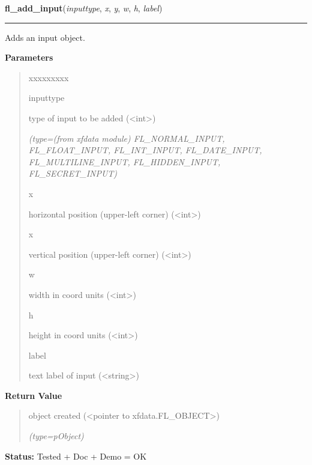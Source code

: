\hspace{.8\funcindent}\begin{boxedminipage}{\funcwidth}

    \raggedright \textbf{fl\_add\_input}(\textit{inputtype}, \textit{x}, \textit{y}, \textit{w}, \textit{h}, \textit{label})

    \vspace{-1.5ex}

    \rule{\textwidth}{0.5\fboxrule}
\setlength{\parskip}{2ex}
    Adds an input object.

\setlength{\parskip}{1ex}
      \textbf{Parameters}
      \vspace{-1ex}

      \begin{quote}
        \begin{Ventry}{xxxxxxxxx}

          \item[inputtype]

          type of input to be added ({\textless}int{\textgreater})

            {\it (type=(from xfdata module) FL\_NORMAL\_INPUT, FL\_FLOAT\_INPUT, FL\_INT\_INPUT, 
FL\_DATE\_INPUT, FL\_MULTILINE\_INPUT, FL\_HIDDEN\_INPUT, FL\_SECRET\_INPUT)}

          \item[x]

          horizontal position (upper-left corner) 
          ({\textless}int{\textgreater})

          \item[x]

          vertical position (upper-left corner) 
          ({\textless}int{\textgreater})

          \item[w]

          width in coord units ({\textless}int{\textgreater})

          \item[h]

          height in coord units ({\textless}int{\textgreater})

          \item[label]

          text label of input ({\textless}string{\textgreater})

        \end{Ventry}

      \end{quote}

      \textbf{Return Value}
    \vspace{-1ex}

      \begin{quote}
      object created ({\textless}pointer to 
      xfdata.FL\_OBJECT{\textgreater})

      {\it (type=pObject)}

      \end{quote}

\textbf{Status:} Tested + Doc + Demo = OK



    \end{boxedminipage}

